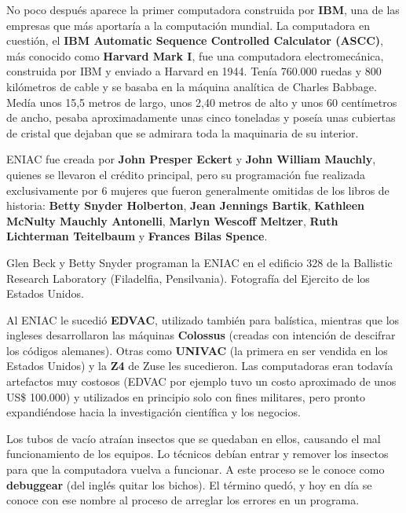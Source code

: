  No poco después aparece la primer computadora
construida por \textbf{IBM}, una de las empresas que más aportaría a la
computación mundial. La computadora en cuestión, el \textbf{IBM Automatic
Sequence Controlled Calculator (ASCC)}, más conocido como \textbf{Harvard Mark
I}, fue una computadora electromecánica, construida por IBM y enviado a Harvard
en 1944. Tenía 760.000 ruedas y 800 kilómetros de cable y se basaba en la
máquina analítica de Charles Babbage. Medía unos 15,5 metros de largo, unos 2,40
metros de alto y unos 60 centímetros de ancho, pesaba aproximadamente unas cinco
toneladas y poseía unas cubiertas de cristal que dejaban que se admirara toda la
maquinaria de su interior.
\autocite[p. 32]{ceruzzi_2012}

\begin{knowwhat}
    ENIAC fue creada por \textbf{John Presper Eckert} y \textbf{John William
    Mauchly}, quienes se llevaron el crédito principal, pero su programación fue
    realizada exclusivamente por 6 mujeres que fueron generalmente omitidas de
    los libros de historia: \textbf{Betty Snyder Holberton}, \textbf{Jean
    Jennings Bartik}, \textbf{Kathleen McNulty Mauchly Antonelli},
    \textbf{Marlyn Wescoff Meltzer}, \textbf{Ruth Lichterman Teitelbaum} y
    \textbf{Frances Bilas Spence}.
\end{knowwhat}

{Glen Beck y Betty Snyder programan la ENIAC en el edificio 328 de la Ballistic
Research Laboratory (Filadelfia, Pensilvania).} {Fotografía del Ejercito de los
Estados Unidos.}

Al ENIAC le sucedió \textbf{EDVAC}, utilizado también para balística, mientras
que los ingleses desarrollaron las máquinas \textbf{Colossus} (creadas con
intención de descifrar los códigos alemanes). Otras como \textbf{UNIVAC} (la
primera en ser vendida en los Estados Unidos) y la \textbf{Z4} de Zuse les
sucedieron. Las computadoras eran todavía artefactos muy costosos (EDVAC por
ejemplo tuvo un costo aproximado de unos US\$ 100.000) y utilizados en principio
solo con fines militares, pero pronto expandiéndose hacia la investigación
científica y los negocios.

\begin{knowwhat} Los tubos de vacío atraían
    insectos que se quedaban en ellos, causando el mal funcionamiento de los
    equipos. Lo técnicos debían entrar y remover los insectos para que la
    computadora vuelva a funcionar. A este proceso se le conoce como
    \textbf{debuggear} (del inglés quitar los bichos). El término quedó, y hoy
    en día se conoce con ese nombre al proceso de arreglar los errores en un
    programa.
\end{knowwhat}

